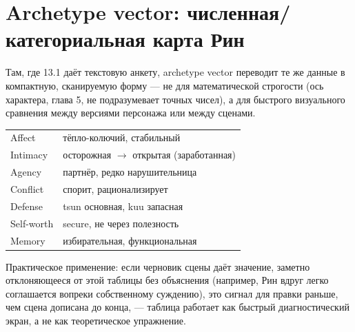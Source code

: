 \section{Archetype vector: численная/категориальная карта Рин}

Там, где 13.1 даёт текстовую анкету, archetype vector переводит те же данные в компактную, сканируемую форму — не для математической строгости (ось характера, глава 5, не подразумевает точных чисел), а для быстрого визуального сравнения между версиями персонажа или между сценами.

\begin{center}
\begin{tabular}{ll}
Affect & тёпло-колючий, стабильный \\
Intimacy & осторожная $\to$ открытая (заработанная) \\
Agency & партнёр, редко нарушительница \\
Conflict & спорит, рационализирует \\
Defense & tsun основная, kuu запасная \\
Self-worth & secure, не через полезность \\
Memory & избирательная, функциональная \\
\end{tabular}
\end{center}

Практическое применение: если черновик сцены даёт значение, заметно отклоняющееся от этой таблицы без объяснения (например, Рин вдруг легко соглашается вопреки собственному суждению), это сигнал для правки раньше, чем сцена дописана до конца, — таблица работает как быстрый диагностический экран, а не как теоретическое упражнение.
